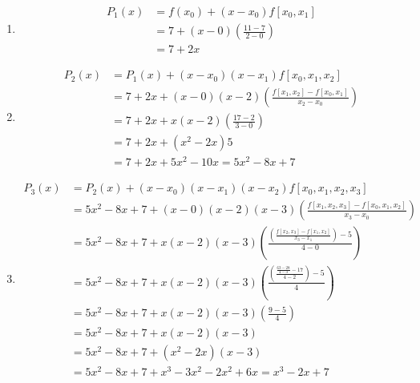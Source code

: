 \documentclass[12pt]{article}
\newenvironment{problem}[2][Problem]{\begin{trivlist}
\item[\hskip \labelsep {\bfseries #1}\hskip \labelsep {\bfseries #2.}]}{\end{trivlist}}
\begin{document}
\begin{enumerate}
	\item[a)]\begin{align*}
			P_1(x) &= f(x_0) + (x - x_0)f[x_0, x_1]\\
			&= 7 + (x - 0)(\frac{11-7}{2-0})\\
			&= 7 + 2x
		  \end{align*}
	\item[b)] \begin{align*}
			P_2(x) &= P_1(x) + (x - x_0)(x - x_1)f[x_0, x_1, x_2]\\
			&= 7 + 2x + (x - 0)(x - 2)(\frac{f[x_1, x_2] - f[x_0, x_1]}{x_2 - x_0})\\
			&= 7 + 2x + x(x-2)(\frac{17 - 2}{3-0})\\
			&= 7 + 2x + (x^2 - 2x)5\\
			&= 7 + 2x + 5x^2 - 10x = 5x^2 - 8x + 7
		  \end{align*}
	\item[c)] \begin{align*}
			P_3(x) &= P_2(x) + (x - x_0)(x - x_1)(x - x_2)f[x_0, x_1, x_2, x_3]\\
			&= 5x^2 - 8x + 7 + (x - 0)(x - 2)(x - 3)(\frac{f[x_1, x_2, x_3] - f[x_0, x_1, x_2]}{x_3 - x_0})\\
			&= 5x^2 - 8x + 7 + x(x-2)(x-3)(\frac{(\frac{f[x_2, x_3] - f[x_1, x_2]}{x_3 - x_1}) - 5}{4 - 0})\\
			&= 5x^2 - 8x + 7 + x(x-2)(x-3)(\frac{(\frac{\frac{63-28}{4-3} - 17}{4 - 2}) - 5}{4})\\
			&= 5x^2 - 8x + 7 + x(x-2)(x-3)(\frac{9 - 5}{4})\\
			&= 5x^2 - 8x + 7 + x(x-2)(x-3)\\
			&= 5x^2 - 8x + 7 + (x^2 - 2x)(x - 3)\\
			&= 5x^2 - 8x + 7 + x^3 - 3x^2 - 2x^2 + 6x = x^3 - 2x + 7
		  \end{align*}
\end{enumerate}

\begin{problem}{3}
\end{problem}
\end{document}
